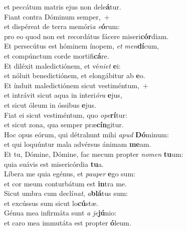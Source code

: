 \oddverse et peccátum matris ejus non dele\textbf{á}tur.\\
\evenverse Fiant contra Dóminum semper,~+\\
\evenverse  et dispéreat de terra memóri\textit{a} \textit{e}\textbf{ó}rum:~\*\\
\evenverse pro eo quod non est recordátus fácere miseri\textbf{cór}diam.\\
\oddverse Et persecútus est hóminem ínopem, \textit{et} \textit{men}\textbf{dí}cum,~\*\\
\oddverse et compúnctum corde mortifi\textbf{cá}re.\\
\evenverse Et diléxit maledictiónem, et vé\textit{ni}\textit{et} \textbf{e}i:~\*\\
\evenverse et nóluit benedictiónem, et elongábitur ab \textbf{e}o.\\
\oddverse Et índuit maledictiónem sicut vestiméntum,~+\\
\oddverse  et intrávit sicut aqua in interi\textit{ó}\textit{ra} \textbf{e}jus,~\*\\
\oddverse et sicut óleum in óssibus \textbf{e}jus.\\
\evenverse Fiat ei sicut vestiméntum, quo \textit{o}\textit{pe}\textbf{rí}tur:~\*\\
\evenverse et sicut zona, qua semper præ\textbf{cín}gitur.\\
\oddverse Hoc opus eórum, qui détrahunt mihi \textit{a}\textit{pud} \textbf{Dó}minum:~\*\\
\oddverse et qui loquúntur mala advérsus ánimam \textbf{me}am.\\
\evenverse Et tu, Dómine, Dómine, fac mecum propter \textit{no}\textit{men} \textbf{tu}um:~\*\\
\evenverse quia suávis est misericórdia \textbf{tu}a.\\
\oddverse Líbera me quia egénus, et \textit{pau}\textit{per} \textbf{e}go sum:~\*\\
\oddverse et cor meum conturbátum est \textbf{in}tra me.\\
\evenverse Sicut umbra cum declí\textit{nat}, \textit{a}\textbf{blá}tus sum:~\*\\
\evenverse et excússus sum sicut lo\textbf{cú}stæ.\\
\oddverse Génua mea infirmáta sunt \textit{a} \textit{je}\textbf{jú}nio:~\*\\
\oddverse et caro mea immutáta est propter \textbf{ó}leum.\\
